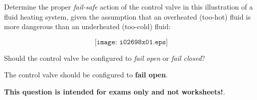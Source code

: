 

Determine the proper {\it fail-safe} action of the control valve in this illustration of a fluid heating system, given the assumption that an overheated (too-hot) fluid is more dangerous than an underheated (too-cold) fluid:

$$\texttt{[image: i02698x01.eps]}$$

Should the control valve be configured to {\it fail open} or {\it fail closed}?







The control valve should be configured to {\bf fail open}.







{\bf This question is intended for exams only and not worksheets!}.



